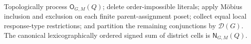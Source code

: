 Topologically process \(\mathsf O_{G,M}(Q)\); delete order-impossible literals; apply Möbius inclusion and exclusion on each finite parent-assignment poset; collect equal local response-type restrictions; and partition the remaining conjunctions by \(\mathcal D(G)\). The canonical lexicographically ordered signed sum of district cells is \(\mathsf N_{G,M}(Q)\).